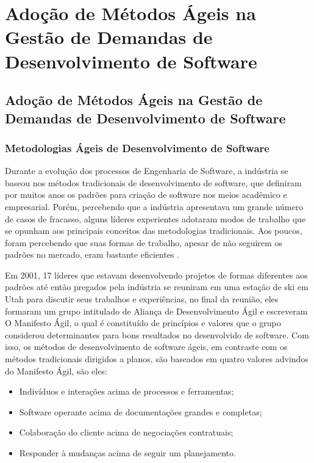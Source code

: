 \part{Adoção de Métodos Ágeis na Gestão de Demandas de Desenvolvimento de Software}

\chapter[Adoção de Métodos Ágeis na Gestão de Demandas de Desenvolvimento de Software]{Adoção de Métodos Ágeis na Gestão de Demandas de Desenvolvimento de Software}

\section[Metodologias Ágeis de Desenvolvimento de Software]{Metodologias Ágeis de Desenvolvimento de Software}

Durante a evolução dos processos de Engenharia de Software, a indústria se baseou nos métodos tradicionais de desenvolvimento de software, que definiram por muitos anos os padrões para criação de software nos meios acadêmico e empresarial. Porém, percebendo que a indústria apresentava um grande número de casos de fracasso, alguns líderes experientes adotaram modos de trabalho que se opunham aos principais conceitos das metodologias tradicionais. Aos poucos, foram percebendo que suas formas de trabalho, apesar de não seguirem os padrões no mercado, eram bastante eficientes   \cite{filho}. 

Em 2001, 17 líderes que estavam desenvolvendo projetos de formas diferentes aos padrões até então pregados pela indústria se reuniram em uma estação de ski em Utah para discutir seus trabalhos e experiências, no final da reunião, eles formaram um grupo intitulado de Aliança de Desenvolvimento Ágil e escreveram O Manifesto Ágil, o qual é constituído de princípios e valores que o grupo considerou determinantes para bons resultados no desenvolvido de software. Com isso, os métodos de desenvolvimento de software ágeis, em contraste com os métodos tradicionais dirigidos a planos, são baseados em quatro valores advindos do Manifesto Ágil, são eles:
\begin{itemize}
\item Indivíduos e interações acima de processos e ferramentas;
\item Software operante acima de documentações grandes e completas;
\item Colaboração do cliente acima de negociações contratuais;
\item Responder à mudanças acima de seguir um planejamento.
\end{itemize}

